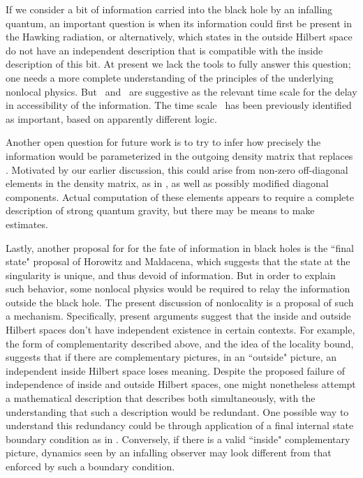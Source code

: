 If we consider a bit of information carried into the black hole by an infalling quantum, an important question is when its information could first be present in the Hawking radiation, or alternatively, which states in the outside Hilbert space do not have an independent description that is compatible with the inside description of this bit.  At present we lack the tools to fully answer this question; one needs a more complete understanding of the principles of the underlying nonlocal physics.  But \locbdt\ and \locbte\ are suggestive as the relevant time scale for the delay in accessibility of the information.   The time scale \locbte\ has been previously identified as important, based on apparently different logic.

Another open question for future work is to try to infer how precisely the information would be parameterized in the outgoing density matrix that replaces \densmat. Motivated by our earlier discussion, this could arise from non-zero off-diagonal elements in the density matrix, as in \extwo, as well as possibly modified diagonal components.  Actual computation of these elements appears to require a complete description of strong quantum gravity, but there may be means to make estimates.

Lastly, another proposal for for the fate of information in black holes is the ``final state" proposal of Horowitz and Maldacena, which suggests that the state at the singularity is unique, and thus devoid of information.  But in order to explain such behavior, some nonlocal physics would be required to relay the information outside the black hole.  The present discussion of nonlocality is a proposal of such a mechanism. Specifically, present arguments suggest that the inside and outside Hilbert spaces don't have independent existence in certain contexts.  For example, the  form of complementarity described above, and the idea of the locality bound, suggests that if there are complementary pictures, in an ``outside" picture, an independent inside Hilbert space loses meaning.  Despite the proposed failure of independence of inside and outside Hilbert spaces, one might nonetheless attempt a mathematical description that describes both simultaneously, with the understanding that such a description would be redundant.   One possible way to understand this redundancy could be through
application of a final internal state boundary condition as in \HoMa.
Conversely, if there is a valid ``inside" complementary picture, dynamics seen by an infalling observer may look different from that enforced by such a boundary condition.

